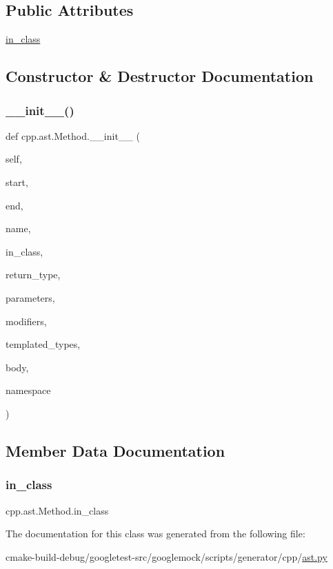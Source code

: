 \subsection*{Public Attributes}
\begin{DoxyCompactItemize}
\item 
\mbox{\hyperlink{classcpp_1_1ast_1_1Method_aa67244c3673afed43398b5d3e3fa6c1c}{in\+\_\+class}}
\end{DoxyCompactItemize}


\subsection{Constructor \& Destructor Documentation}
\mbox{\label{classcpp_1_1ast_1_1Method_aa3cbdc9c4b7e92b15fa6acea0dbf2322}} 
\subsubsection{\texorpdfstring{\_\_init\_\_()}{\_\_init\_\_()}}
{\footnotesize\ttfamily def cpp.\+ast.\+Method.\+\_\+\+\_\+init\+\_\+\+\_\+ (\begin{DoxyParamCaption}\item[{}]{self,  }\item[{}]{start,  }\item[{}]{end,  }\item[{}]{name,  }\item[{}]{in\+\_\+class,  }\item[{}]{return\+\_\+type,  }\item[{}]{parameters,  }\item[{}]{modifiers,  }\item[{}]{templated\+\_\+types,  }\item[{}]{body,  }\item[{}]{namespace }\end{DoxyParamCaption})}



\subsection{Member Data Documentation}
\mbox{\label{classcpp_1_1ast_1_1Method_aa67244c3673afed43398b5d3e3fa6c1c}} 
\subsubsection{\texorpdfstring{in\_class}{in\_class}}
{\footnotesize\ttfamily cpp.\+ast.\+Method.\+in\+\_\+class}



The documentation for this class was generated from the following file\+:\begin{DoxyCompactItemize}
\item 
cmake-\/build-\/debug/googletest-\/src/googlemock/scripts/generator/cpp/\mbox{\hyperlink{ast_8py}{ast.\+py}}\end{DoxyCompactItemize}
